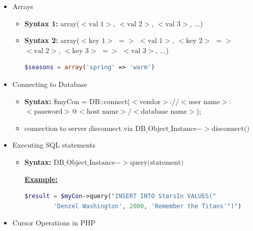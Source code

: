 \documentclass[12pt]{article}
\begin{document}
\begin{enumerate}[1.]
\begin{enumerate}[a)]
\begin{itemize}
\begin{itemize}
            \end{itemize}

            \item Arrays
            \begin{itemize}
                \item \textbf{Syntax 1:} array($<\text{val 1}>$, $<\text{val 2}>$, $<\text{val 3}>$, ...)
                \item \textbf{Syntax 2:} array($<\text{key 1}>$ $=>$ $<\text{val 1}>$, $<\text{key 2}>$ $=>$  $<\text{val 2}>$, $<\text{key 3}>$ $=>$  $<\text{val 3}>$, ...)
    \begin{lstlisting}[language=PHP]
    $seasons = array('spring' => 'warm')
    \end{lstlisting}

            \end{itemize}

            \item Connecting to Database

            \begin{itemize}
                \item\textbf{Syntax:} $\$$myCon = DB::connect($<\text{vendor}>$://$<\text{user name}>$:$< \text{password}>@<\text{host name}>$/$<\text{database name}>$);
                \item connection to server disconnect via $\text{DB\_Object\_Instance}->\text{disconnect()}$
            \end{itemize}

            \item Executing SQL statements
            \begin{itemize}
                \item \textbf{Syntax:} $\text{DB\_Object\_Instance}->\text{query(statement)}$

                \bigskip

                \underline{\textbf{Example:}}

                \bigskip

    \begin{lstlisting}[language=PHP]
    $result = $myCon->query("INSERT INTO StarsIn VALUES("
        'Denzel Washington', 2000, 'Remember the Titans'")")
    \end{lstlisting}

            \end{itemize}

            \item Cursor Operations in PHP


\end{itemize}
\end{enumerate}
\end{enumerate}
\end{document}
